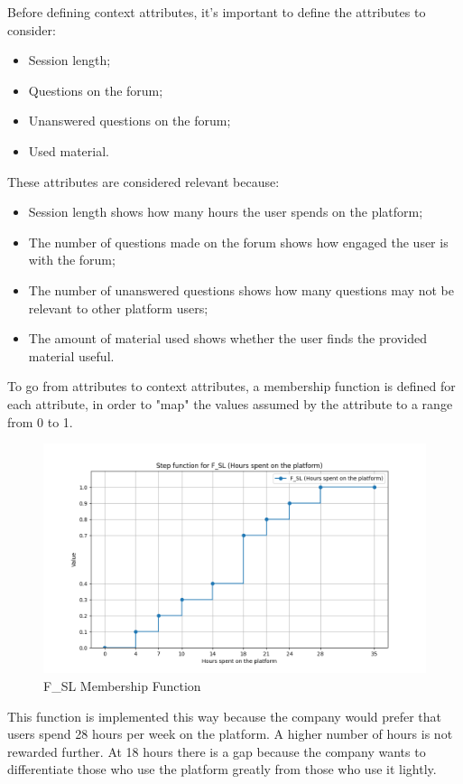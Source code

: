 Before defining context attributes, it's important to define the attributes to consider:
\begin{itemize}
    \item Session length;
    \item Questions on the forum;
    \item Unanswered questions on the forum;
    \item Used material.
\end{itemize}
These attributes are considered relevant because:
\begin{itemize}
    \item Session length shows how many hours the user spends on the platform;
    \item The number of questions made on the forum shows how engaged the user is with the forum;
    \item The number of unanswered questions shows how many questions may not be relevant to other platform users;
    \item The amount of material used shows whether the user finds the provided material useful.
\end{itemize}

To go from attributes to context attributes, a membership function is defined for each attribute, in order to "map" the values assumed by the attribute to a range from 0 to 1.

\begin{figure}[H]
    \centering
    \includegraphics[width=\textwidth]{./assets/plot_F_SL.png}
    \caption{F\_SL Membership Function}
    \label{fig:plot_F_SL}
\end{figure}
This function is implemented this way because the company would prefer that users spend 28 hours per week on the platform. A higher number of hours is not rewarded further. At 18 hours there is a gap because the company wants to differentiate those who use the platform greatly from those who use it lightly.


